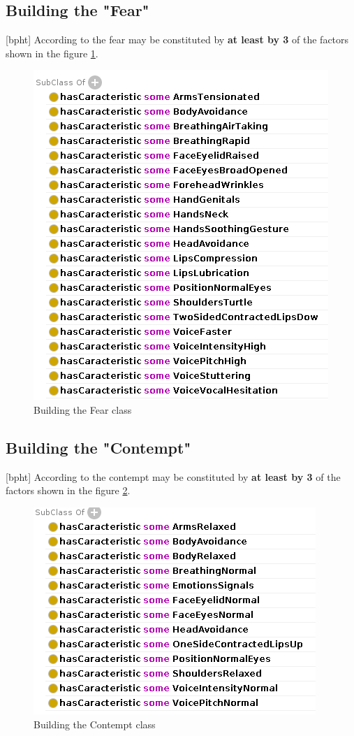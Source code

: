 \documentclass[conference]{IEEEtran}
\begin{document}
\subsection{Building the "Fear"}[bpht]
According to \cite{ekman2001telling} the fear may be constituted by \textbf{at least by 3} of the factors shown in the figure \ref{fig:fear}.
\begin{figure}[bpht]
	\centering
	\includegraphics[width=0.7\linewidth]{fear}
	\caption{Building the Fear class}
	\label{fig:fear}
\end{figure}

\subsection{Building the "Contempt"}[bpht]
According to \cite{ekman2001telling} the contempt may be constituted by \textbf{at least by 3} of the factors shown in the figure \ref{fig:contempt}.
\begin{figure}[bpht]
	\centering
	\includegraphics[width=0.7\linewidth]{contempt}
	\caption{Building the Contempt class}
	\label{fig:contempt}
\end{figure}
\end{document}
